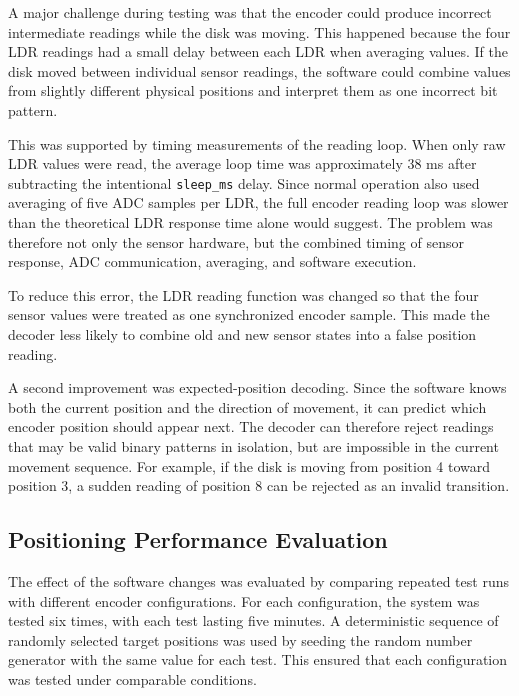 A major challenge during testing was that the encoder could produce incorrect intermediate readings while the disk was moving. This happened because the four LDR readings had a small delay between each LDR when averaging values. If the disk moved between individual sensor readings, the software could combine values from slightly different physical positions and interpret them as one incorrect bit pattern.



This was supported by timing measurements of the reading loop. When only raw LDR values were read, the average loop time was approximately 38 ms after subtracting the intentional \texttt{sleep\_ms} delay. Since normal operation also used averaging of five ADC samples per LDR, the full encoder reading loop was slower than the theoretical LDR response time alone would suggest. The problem was therefore not only the sensor hardware, but the combined timing of sensor response, ADC communication, averaging, and software execution.

To reduce this error, the LDR reading function was changed so that the four sensor values were treated as one synchronized encoder sample. This made the decoder less likely to combine old and new sensor states into a false position reading.

A second improvement was expected-position decoding. Since the software knows both the current position and the direction of movement, it can predict which encoder position should appear next. The decoder can therefore reject readings that may be valid binary patterns in isolation, but are impossible in the current movement sequence. For example, if the disk is moving from position 4 toward position 3, a sudden reading of position 8 can be rejected as an invalid transition.




\subsection{Positioning Performance Evaluation}


The effect of the software changes was evaluated by comparing repeated test runs with different encoder configurations. For each configuration, the system was tested six times, with each test lasting five minutes. A deterministic sequence of randomly selected target positions was used by seeding the random number generator with the same value for each test. This ensured that each configuration was tested under comparable conditions.


